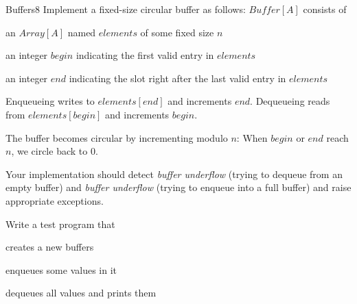 \documentclass[a4paper]{article}
\begin{document}
\begin{problem}{Buffers}{8}
Implement a fixed-size circular buffer as follows: $\mathit{Buffer}[A]$ consists of
\begin{compactitem}
 \item an $Array[A]$ named $elements$ of some fixed size $n$
 \item an integer $begin$ indicating the first valid entry in $elements$
 \item an integer $end$ indicating the slot right after the last valid entry in $elements$
\end{compactitem}
Enqueueing writes to $elements[end]$ and increments $end$.
Dequeueing reads from $elements[begin]$ and increments $begin$.

The buffer becomes circular by incrementing modulo $n$: When $begin$ or $end$ reach $n$, we circle back to $0$.

Your implementation should detect \emph{buffer underflow} (trying to dequeue from an empty buffer) and \emph{buffer underflow} (trying to enqueue into a full buffer) and raise appropriate exceptions.

Write a test program that
\begin{compactitem}
 \item creates a new buffers
 \item enqueues some values in it
 \item dequeues all values and prints them
\end{compactitem}
\end{problem}
\end{document}
